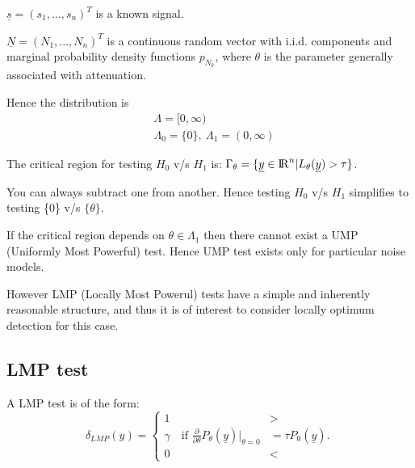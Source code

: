 \documentclass[12pt]{report}
\begin{document}
	\begin{assum}
		$\underline{s}=(s_{1},...,s_{n})^T$ is a known signal.
	\end{assum}
	
	\begin{assum} $\underline{N}=(N_{1},...,N_{n})^T$ is a continuous random vector with i.i.d. components and marginal probability density functions $p_{N_{k}}$, where $\theta$ is the parameter generally associated with attenuation.
	\end{assum}
	\noindent Hence the distribution is
	\begin{align*}
	&\Lambda = [0, \infty)\\
	&\Lambda_0 = \{0\} , \ \Lambda_1 = (0, \infty)
	\end{align*}
	
	\begin{defn}
		\noindent The critical region for testing $H_0$ v/s $H_1$ is: $\Gamma_{\theta}=\{\underline{y}\in{\rm I\!R}^n|L_{\theta}(\underline{y})>\tau\}$.
	\end{defn}
	
	\begin{note}
		You can always subtract one from another. Hence testing  $H_0$ v/s $H_1$ simplifies to testing \{0\} v/s $\{\theta\}$.  
	\end{note}
	
	\begin{note} 
		If the critical region depends on $\theta \in \Lambda_1$ then there cannot exist a UMP (Uniformly Most Powerful) test. Hence UMP test exists only for particular noise models.
	\end{note}
	
	\begin{note}
		However LMP (Locally Most Powerul) tests have a simple and inherently reasonable structure, and thus it is of interest to consider locally optimum detection for this case.
	\end{note}
	
	\subsection{LMP test}
	
	\par A LMP test is of the form:
	\begin{equation}
	\delta_{LMP}(y)=\begin{cases}
	1&>\\
	\gamma \quad\text{if }\frac{\partial}{\partial\theta}P_{\theta}(\underline{y})\big|_{\theta=0}&=\tau P_{0}(\underline{y}).\\
	0&<
	\end{cases}
	\end{equation}
	
\end{document}
